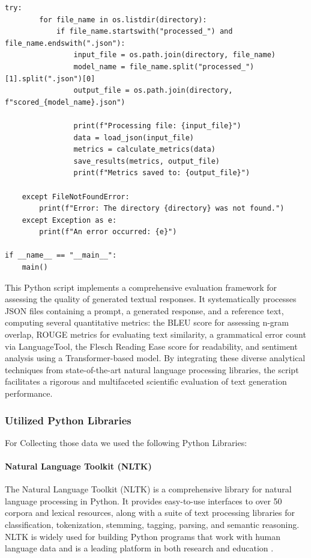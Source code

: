\begin{lstlisting}[style=Python, caption={Python-data-preperation-for-analysis}, captionpos=b]
    try:
        for file_name in os.listdir(directory):
            if file_name.startswith("processed_") and file_name.endswith(".json"):
                input_file = os.path.join(directory, file_name)
                model_name = file_name.split("processed_")[1].split(".json")[0]
                output_file = os.path.join(directory, f"scored_{model_name}.json")

                print(f"Processing file: {input_file}")
                data = load_json(input_file)
                metrics = calculate_metrics(data)
                save_results(metrics, output_file)
                print(f"Metrics saved to: {output_file}")

    except FileNotFoundError:
        print(f"Error: The directory {directory} was not found.")
    except Exception as e:
        print(f"An error occurred: {e}")

if __name__ == "__main__":
    main()
\end{lstlisting}

This Python script implements a comprehensive evaluation framework for assessing the quality of generated textual responses. 
It systematically processes JSON files containing a prompt, a generated response, and a reference text, computing several quantitative metrics: 
the BLEU score for assessing n-gram overlap, ROUGE metrics for evaluating text similarity, a grammatical error count via LanguageTool, 
the Flesch Reading Ease score for readability, and sentiment analysis using a Transformer-based model. 
By integrating these diverse analytical techniques from state-of-the-art natural language processing libraries, 
the script facilitates a rigorous and multifaceted scientific evaluation of text generation performance.

\subsubsection{Utilized Python Libraries}
For Collecting those data we used the following Python Libraries:

\paragraph{Natural Language Toolkit (NLTK)}
The Natural Language Toolkit (NLTK) is a comprehensive library for natural language processing in Python. It provides easy-to-use interfaces to over 50 corpora and lexical resources, along with a suite of text processing libraries for classification, tokenization, stemming, tagging, parsing, and semantic reasoning. NLTK is widely used for building Python programs that work with human language data and is a leading platform in both research and education \cite{nltk}.

